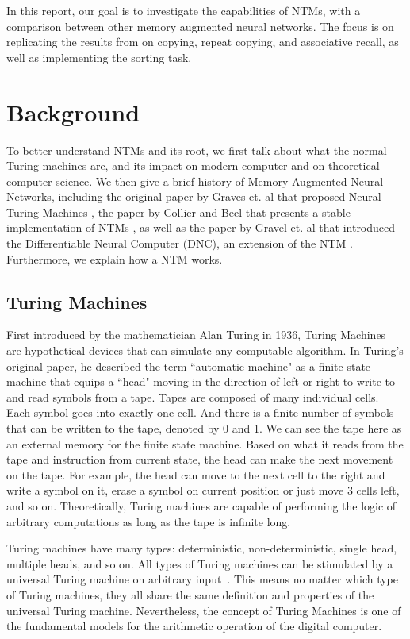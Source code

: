 \documentclass[12pt,twoside]{article}
\theoremstyle{plain}
\theoremstyle{definition}
\theoremstyle{remark}
\begin{document}
In this report, our goal is to investigate the capabilities of NTMs, with a comparison between other memory augmented neural networks. The focus is on replicating the results from \cite{implementing-ntm} on copying, repeat copying, and associative recall, as well as implementing the sorting task.

\section{Background}
\label{sec:backgroud}
To better understand NTMs and its root, we first talk about what the normal Turing machines are, and its impact on modern computer and on theoretical computer science. We then give a brief history of Memory Augmented Neural Networks, including the original paper by Graves et. al that proposed Neural Turing Machines \cite{original-ntm}, the paper by Collier and Beel that presents a stable implementation of NTMs \cite{implementing-ntm}, as well as the paper by Gravel et. al that introduced the Differentiable Neural Computer (DNC), an extension of the NTM \cite{original-dnc}. Furthermore, we explain how a NTM works.

\subsection{Turing Machines}
First introduced by the mathematician Alan Turing in 1936, Turing Machines~\cite{turing} are hypothetical devices that can simulate any computable algorithm. In Turing's original paper, he described the term ``automatic machine" as a finite state machine that equips a ``head" moving in the direction of left or right to write to and read symbols from a tape. Tapes are composed of many individual cells. Each symbol goes into exactly one cell. And there is a finite number of symbols that can be written to the tape, denoted by 0 and 1. We can see the tape here as an external memory for the finite state machine. Based on what it reads from the tape and instruction from current state, the head can make the next movement on the tape. For example, the head can move to the next cell to the right and write a symbol on it, erase a symbol on current position or just move 3 cells left, and so on. Theoretically, Turing machines are capable of performing the logic of arbitrary computations as long as the tape is infinite long.

Turing machines have many types: deterministic, non-deterministic, single head, multiple heads, and so on. All types of Turing machines can be stimulated by a universal Turing machine on arbitrary input~\cite{turing1938}. This means no matter which type of Turing machines, they all share the same definition and properties of the universal Turing machine. Nevertheless, the concept of Turing Machines is one of the fundamental models for the arithmetic operation of the digital computer.
\end{document}
